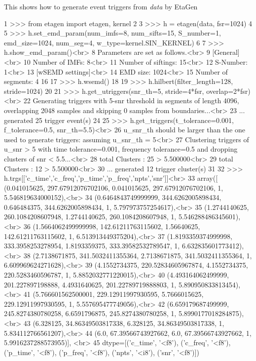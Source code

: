 \begin{DoxyItemize}
\item This shows how to generate event triggers from {\itshape data} by Eta\+Gen~\newline
 
\begin{DoxyCode}
1 >>> from etagen import etagen, kernel
2 
3 >>> h = etagen(data, fsr=1024)
4 
5 >>> h.set\_emd\_param(num\_imfs=8, num\_sifts=15, S\_number=1, emd\_size=1024, num\_seg=4,
       w\_type=kernel.SIN\_KERNEL)
6 
7 >>> h.show\_emd\_param()<br>
8 Parameters are set as follows.<br>
9 [General]<br>
10 Number of IMFs: 8<br>
11 Number of siftings:     15<br>
12 S-Number:       1<br>
13 [wSEMD settings]<br>
14 EMD size:       1024<br>
15 Number of segments:     4
16 
17 >>> h.wsemd()
18 
19 >>> h.hilbert(filter\_length=128, stride=1024)
20 
21 >>> h.get\_utriggers(snr\_th=5, stride=4*fsr, overlap=2*fsr)<br>
22 Generating triggers with 5-snr threshold in segments of length 4096, overlapping 2048 samples and skipping
       0 samples from boundaries...<br>
23 ... generated 25 trigger event(s)
24 
25 >>> h.get\_triggers(t\_tolerance=0.001, f\_tolerance=0.5, snr\_th=5.5)<br>
26 u\_snr\_th should be larger than the one used to generate triggers: assuming u\_snr\_th = 5<br>
27 Clustering triggers of u\_snr > 5 with time tolerance=0.001, frequency tolerance=0.5 and dropping clusters
       of snr < 5.5...<br>
28 total Clusters : 25 > 5.500000<br>
29 total Clusters : 12 > 5.500000<br>
30 ... generated 12 trigger cluster(s)
31 
32 >>> h.trgs[['c\_time','c\_freq','p\_time','p\_freq','npts','snr']]<br>
33 array([ (0.041015625, 297.67912076702106, 0.041015625, 297.67912076702106, 1, 5.546819634000152),<br>
34    (0.6464843749999999, 344.6262005898434, 0.646484375, 344.6262005898434, 1, 5.797973757254617),<br>
35    (1.2744140625, 260.1084208607948, 1.2744140625, 260.1084208607948, 1, 5.546288486345601),<br>
36    (1.5664062499999998, 142.61211763115602, 1.56640625, 142.61211763115602, 1, 6.513913449375204),<br>
37    (1.8193359374999998, 333.3958253278954, 1.8193359375, 333.39582532789547, 1, 6.632835601773412),<br>
38    (2.7138671875, 341.5032411355364, 2.7138671875, 341.5032411355364, 1, 6.609969624271628),<br>
39    (4.1552734375, 220.52834605967874, 4.1552734375, 220.5283460596787, 1, 5.8852032771220015),<br>
40    (4.493164062499999, 201.227897198888, 4.4931640625, 201.22789719888803, 1, 5.890950833813454),<br>
41    (5.766601562500001, 229.12911997930595, 5.7666015625, 229.12911997930595, 1, 5.557695477749056),<br>
42    (6.659179687499999, 245.8274380780258, 6.6591796875, 245.8274380780258, 1, 5.8990177018284875),<br>
43    (6.328125, 34.86349503817338, 6.328125, 34.86349503817338, 1, 5.834112766561207),<br>
44    (6.0, 67.39566743927662, 6.0, 67.39566743927662, 1, 5.9916237288573955)], <br>
45   dtype=[('c\_time', '<f8'), ('c\_freq', '<f8'), ('p\_time', '<f8'), ('p\_freq', '<f8'), ('npts', '<i8'),
       ('snr', '<f8')])
\end{DoxyCode}
 
\end{DoxyItemize}